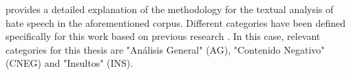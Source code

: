 

\cite{lameiras-2024} provides a detailed explanation of the methodology for the textual analysis of hate speech in the aforementioned corpus. Different categories have been defined specifically for this work based on previous research \cite{calderon-2020}. In this case, relevant categories for this thesis are "Análisis General" (AG), "Contenido Negativo" (CNEG) and "Insultos" (INS). 



